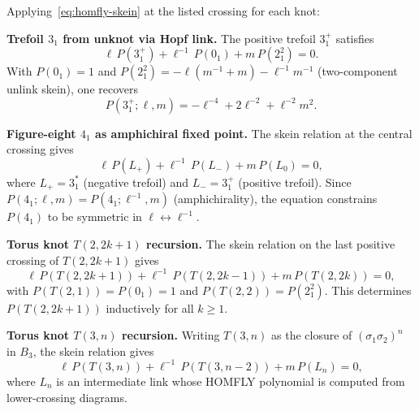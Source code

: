 \begin{remark}
\label{rem:skein-computations}
Applying~\eqref{eq:homfly-skein} at the listed crossing for each knot:

\medskip
\noindent\textbf{Trefoil $3_1$ from unknot via Hopf link.}\;
The positive trefoil $3_1^+$ satisfies
\begin{equation}\label{eq:skein-trefoil}
  \ell\,P(3_1^+) + \ell^{-1}\,P(0_1) + m\,P(2^2_1) = 0.
\end{equation}
With $P(0_1)=1$ and $P(2^2_1) = -\ell(m^{-1}+m) - \ell^{-1}m^{-1}$
(two-component unlink skein), one recovers
\[
  P(3_1^+; \ell, m) = -\ell^{-4}+2\ell^{-2}+\ell^{-2}m^2.
\]

\noindent\textbf{Figure-eight $4_1$ as amphichiral fixed point.}\;
The skein relation at the central crossing gives
\begin{equation}\label{eq:skein-fig8}
  \ell\,P(L_+) + \ell^{-1}\,P(L_-) + m\,P(L_0) = 0,
\end{equation}
where $L_+ = 3_1^*$ (negative trefoil) and $L_- = 3_1^+$ (positive trefoil).
Since $P(4_1;\ell,m) = P(4_1;\ell^{-1},m)$ (amphichirality),
the equation constrains $P(4_1)$ to be symmetric in $\ell\leftrightarrow\ell^{-1}$.

\noindent\textbf{Torus knot $T(2,2k+1)$ recursion.}\;
The skein relation on the last positive crossing of $T(2,2k+1)$ gives
\begin{equation}\label{eq:skein-torus-2n}
  \ell\,P(T(2,2k+1)) + \ell^{-1}\,P(T(2,2k-1)) + m\,P(T(2,2k)) = 0,
\end{equation}
with $P(T(2,1))=P(0_1)=1$ and $P(T(2,2))=P(2^2_1)$.
This determines $P(T(2,2k+1))$ inductively for all $k \ge 1$.

\noindent\textbf{Torus knot $T(3,n)$ recursion.}\;
Writing $T(3,n)$ as the closure of $(\sigma_1\sigma_2)^n$ in $B_3$, the skein relation gives
\begin{equation}\label{eq:skein-torus-3n}
  \ell\,P(T(3,n)) + \ell^{-1}\,P(T(3,n-2)) + m\,P(L_n) = 0,
\end{equation}
where $L_n$ is an intermediate link whose HOMFLY polynomial is computed
from lower-crossing diagrams.
\end{remark}

